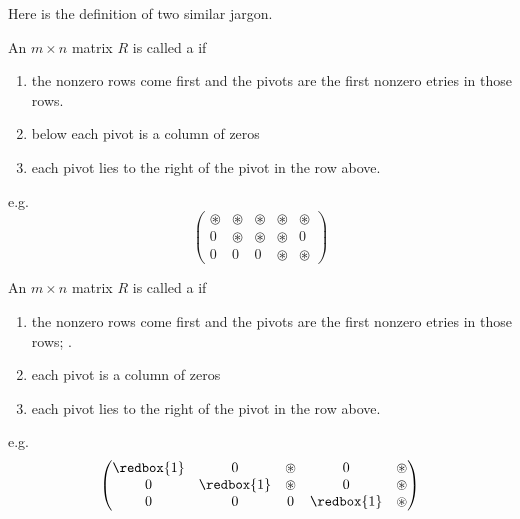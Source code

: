 \begin{definition*}
    Here is the definition of two similar jargon.
    \begin{definition}
        An $m \times n$ matrix $R$ is called a  if 
        \begin{enumerate}[label=(\roman*)]
            \item the nonzero rows come first and the pivots are the first nonzero etries in those rows.
            \item below each pivot is a column of zeros
            \item each pivot lies to the right of the pivot in the row above.
        \end{enumerate}
        e.g.
        \[
            \begin{pmatrix}
            \circledast & \circledast & \circledast & \circledast & \circledast\\
            0           & \circledast & \circledast & \circledast & 0\\
            0           & 0           & 0           & \circledast & \circledast
            \end{pmatrix}
        \]

    \end{definition}

    \begin{definition}
        An $m \times n$ matrix $R$ is called a   if 
        \begin{enumerate}[label=(\roman*)]
            \item the nonzero rows come first and the pivots are the first nonzero etries in those rows; .
            \item {} each pivot is a column of zeros
            \item each pivot lies to the right of the pivot in the row above.
        \end{enumerate}
        e.g.
        \[
            \begin{pmatrix}
            \redbox{1} & 0 & \circledast & 0 & \circledast\\
            0 & \redbox{1} & \circledast & 0 & \circledast\\
            0 & 0 & 0 & \redbox{1} & \circledast
            \end{pmatrix}
        \]
    \end{definition}
\end{definition*}

